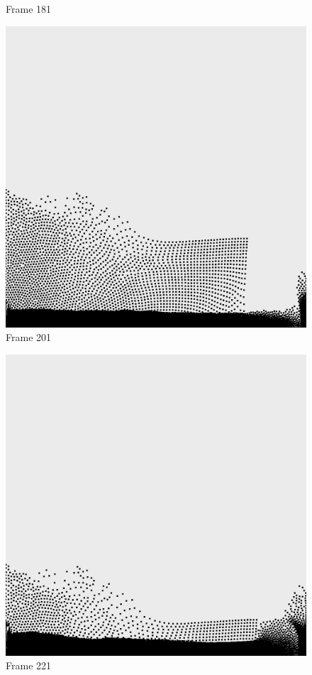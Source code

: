 \documentclass[a4paper, 12pt, oneside]{book}
\begin{document}
\begin{figure}[!ht]
\begin{center}
            Frame 181
        \end{center}
    \endminipage
    \hfill
        \begin{center}
            \includegraphics[width=\linewidth]{images/test_case_2/201.png}
            Frame 201
        \end{center}
    \endminipage
    \hfill
        \begin{center}
            \includegraphics[width=\linewidth]{images/test_case_2/221.png}
            Frame 221
        \end{center}
    \endminipage
    \hfill


\end{figure}
\end{document}
